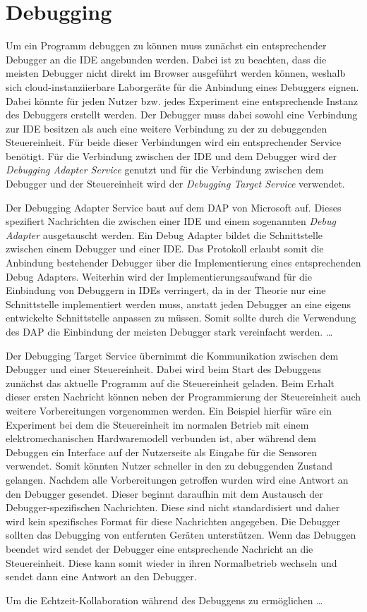 \section{Debugging}\label{section:konzeption:debugging}

Um ein Programm debuggen zu können muss zunächst ein entsprechender Debugger an die IDE angebunden werden. Dabei ist zu beachten, dass die meisten Debugger nicht direkt im Browser ausgeführt werden können, weshalb sich cloud-instanziierbare Laborgeräte für die Anbindung eines Debuggers eignen. Dabei könnte für jeden Nutzer bzw. jedes Experiment eine entsprechende Instanz des Debuggers erstellt werden. Der Debugger muss dabei sowohl eine Verbindung zur IDE besitzen als auch eine weitere Verbindung zu der zu debuggenden Steuereinheit. Für beide dieser Verbindungen wird ein entsprechender Service benötigt. Für die Verbindung zwischen der IDE und dem Debugger wird der \textit{Debugging Adapter Service} genutzt und für die Verbindung zwischen dem Debugger und der Steuereinheit wird der \textit{Debugging Target Service} verwendet.

Der Debugging Adapter Service baut auf dem \ac{DAP} \cite{noauthor_debug-adapter-protocol_nodate} von Microsoft auf. Dieses spezifiert Nachrichten die zwischen einer IDE und einem sogenannten \textit{Debug Adapter} ausgetauscht werden. Ein Debug Adapter bildet die Schnittstelle zwischen einem Debugger und einer IDE. Das Protokoll erlaubt somit die Anbindung bestehender Debugger über die Implementierung eines entsprechenden Debug Adapters. Weiterhin wird der Implementierungsaufwand für die Einbindung von Debuggern in IDEs verringert, da in der Theorie nur eine Schnittstelle implementiert werden muss, anstatt jeden Debugger an eine eigens entwickelte Schnittstelle anpassen zu müssen. Somit sollte durch die Verwendung des \ac{DAP} die Einbindung der meisten Debugger stark vereinfacht werden. \dots

Der Debugging Target Service übernimmt die Kommunikation zwischen dem Debugger und einer Steuereinheit. Dabei wird beim Start des Debuggens zunächst das aktuelle Programm auf die Steuereinheit geladen. Beim Erhalt dieser ersten Nachricht können neben der Programmierung der Steuereinheit auch weitere Vorbereitungen vorgenommen werden. Ein Beispiel hierfür wäre ein Experiment bei dem die Steuereinheit im normalen Betrieb mit einem elektromechanischen Hardwaremodell verbunden ist, aber während dem Debuggen ein Interface auf der Nutzerseite als Eingabe für die Sensoren verwendet. Somit könnten Nutzer schneller in den zu debuggenden Zustand gelangen. Nachdem alle Vorbereitungen getroffen wurden wird eine Antwort an den Debugger gesendet. Dieser beginnt daraufhin mit dem Austausch der Debugger-spezifischen Nachrichten. Diese sind nicht standardisiert und daher wird kein spezifisches Format für diese Nachrichten angegeben. Die Debugger sollten das Debugging von entfernten Geräten unterstützen. Wenn das Debuggen beendet wird sendet der Debugger eine entsprechende Nachricht an die Steuereinheit. Diese kann somit wieder in ihren Normalbetrieb wechseln und sendet dann eine Antwort an den Debugger.

Um die Echtzeit-Kollaboration während des Debuggens zu ermöglichen \dots